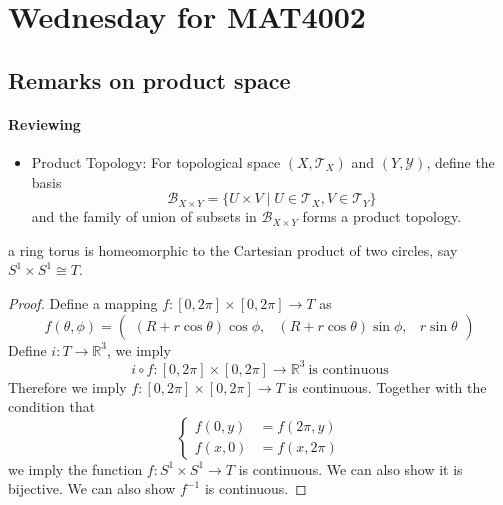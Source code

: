 \section{Wednesday for MAT4002}
\subsection{Remarks on product space} 
\paragraph{Reviewing}
\begin{itemize}
\item
Product Topology: For topological space $(X,\mathcal{T}_X)$ and $(Y,\mathcal{Y})$, define the basis
\[
\mathcal{B}_{X\times Y}=\{U\times V\mid U\in\mathcal{T}_X,V\in\mathcal{T}_Y\}
\]
and the family of union of subsets in $\mathcal{B}_{X\times Y}$ forms a product topology.
\end{itemize}
\begin{proposition}
a ring torus is homeomorphic to the Cartesian product of two circles, say $S^1\times S^1\cong T$.
\end{proposition}
 \begin{proof}
 Define a mapping $f:[0,2\pi]\times [0,2\pi]\to T$ as
 \[
 f(\theta,\phi)=\begin{pmatrix}
(R+r\cos\theta)\cos\phi,
&
(R+r\cos\theta)\sin\phi,
&
r\sin\theta
\end{pmatrix}
 \]
Define $i:T\to\mathbb{R}^3$, we imply
 \[
 i\circ f:[0,2\pi]\times[0,2\pi]\to\mathbb{R}^3\ \text{is continuous}
 \]
 Therefore we imply $f:[0,2\pi]\times [0,2\pi]\to T$ is continuous. Together with the condition that 
\[
\left\{
\begin{aligned}
f(0,y)&=f(2\pi,y)\\
f(x,0)&=f(x,2\pi)
\end{aligned}
\right.
\]
we imply the function $f:S^1\times S^1\to T$ is continuous.
We can also show it is bijective. We can also show $f^{-1}$ is continuous.
 \end{proof}
 
